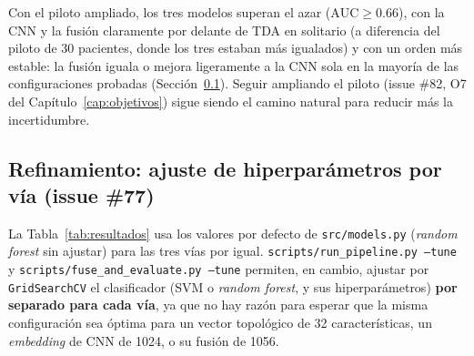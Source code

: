 Con el piloto ampliado, los tres modelos superan el azar
($\text{AUC} \geq 0.66$), con la CNN y la fusión claramente por delante de
TDA en solitario (a diferencia del piloto de 30 pacientes, donde los tres
estaban más igualados) y con un orden más estable: la fusión iguala o
mejora ligeramente a la CNN sola en la mayoría de las configuraciones
probadas (Sección~\ref{sec:refinamiento-clasificacion}). Seguir ampliando
el piloto (issue \#82, O7 del Capítulo~\ref{cap:objetivos}) sigue siendo el
camino natural para reducir más la incertidumbre.

\subsection{Refinamiento: ajuste de hiperparámetros por vía (issue \#77)}
\label{sec:refinamiento-clasificacion}
La Tabla~\ref{tab:resultados} usa los valores por defecto de
\texttt{src/models.py} (\textit{random forest} sin ajustar) para las tres
vías por igual. \texttt{scripts/run\_pipeline.py --tune} y
\texttt{scripts/fuse\_and\_evaluate.py --tune} permiten, en cambio, ajustar
por \texttt{GridSearchCV} el clasificador (SVM o \textit{random forest}, y
sus hiperparámetros) \textbf{por separado para cada vía}, ya que no hay
razón para esperar que la misma configuración sea óptima para un vector
topológico de 32 características, un \textit{embedding} de CNN de 1024, o
su fusión de 1056.

\begin{table}[H]
\centering
\caption{AUC por validación cruzada (5-fold, train, piloto de 70 pacientes)
con \textit{random forest} por defecto, \textit{random forest} ajustada y
SVM ajustada por \texttt{GridSearchCV} ($n\_bins=4$,
$C \in \{0.01,\ldots,100\}$, kernel lineal/RBF). ``Mejor encontrado'' es el
máximo de las tres.}
\label{tab:refinamiento}
\end{table}


